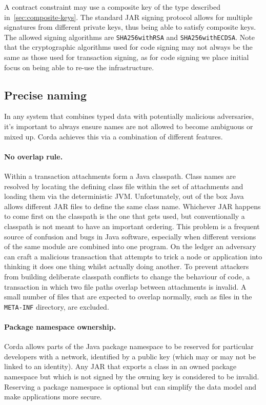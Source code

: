 \documentclass{article}
\begin{document}
A contract constraint may use a composite key of the type described in~\cref{sec:composite-keys}. The standard JAR
signing protocol allows for multiple signatures from different private keys, thus being able to satisfy composite
keys. The allowed signing algorithms are \texttt{SHA256withRSA} and \texttt{SHA256withECDSA}. Note that the
cryptographic algorithms used for code signing may not always be the same as those used for transaction signing, as
for code signing we place initial focus on being able to re-use the infrastructure.

\subsection{Precise naming}\label{subsec:precise-naming}

In any system that combines typed data with potentially malicious adversaries, it's important to always ensure
names are not allowed to become ambiguous or mixed up. Corda achieves this via a combination of different features.

\paragraph{No overlap rule.}Within a transaction attachments form a Java classpath. Class names are resolved by
locating the defining class file within the set of attachments and loading them via the deterministic JVM.
Unfortunately, out of the box Java allows different JAR files to define the same class name. Whichever JAR happens
to come first on the classpath is the one that gets used, but conventionally a classpath is not meant to have an
important ordering. This problem is a frequent source of confusion and bugs in Java software, especially when
different versions of the same module are combined into one program. On the ledger an adversary can craft a
malicious transaction that attempts to trick a node or application into thinking it does one thing whilst actually
doing another. To prevent attackers from building deliberate classpath conflicts to change the behaviour of code, a
transaction in which two file paths overlap between attachments is invalid. A small number of files that are
expected to overlap normally, such as files in the \texttt{META-INF} directory, are excluded.

\paragraph{Package namespace ownership.}Corda allows parts of the Java package namespace to be reserved for
particular developers with a network, identified by a public key (which may or may not be linked to an identity). Any JAR
that exports a class in an owned package namespace but which is not signed by the owning key is considered to be
invalid. Reserving a package namespace is optional but can simplify the data model and make applications more
secure.
\end{document}
